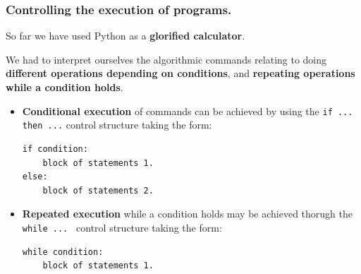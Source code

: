 \documentclass{beamer} %
\newcommand\emc[1]{\textcolor{midred}{\textbf{#1}}}
\begin{document}
\begin{frame}[fragile]
\frametitle{Controlling the execution of programs.} 

So far we have used Python as a \emc{glorified calculator}. 

\vspace{2mm}
We had to interpret ourselves the algorithmic commands relating to doing \emc{different operations depending on conditions}, and \emc{repeating operations while a condition holds}.

\vspace{2mm}
\begin{itemize}
	\item \emc{Conditional execution} of commands can be achieved by using the \texttt{if ... then ...} control structure taking the form:
\begin{Verbatim}[fontsize=\scriptsize]
if condition:
    block of statements 1.
else:
    block of statements 2.
\end{Verbatim}

	\item \emc{Repeated execution} while a condition holds may be achieved thorugh the \texttt{while ... } control structure taking the form:
\begin{Verbatim}[fontsize=\scriptsize]
while condition:
    block of statements 1.
\end{Verbatim}

\end{itemize}

\end{frame}

\end{document}
